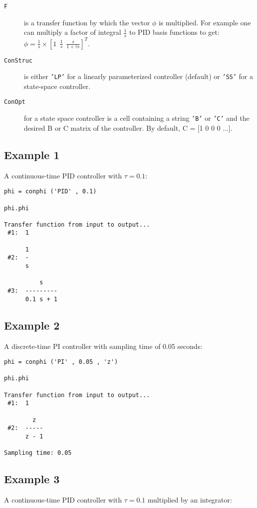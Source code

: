 \documentclass [12pt , a4paper] {report}
\begin{document}
\begin{description}
\item[\texttt{F}] is a transfer function by which the vector $\phi$ is multiplied. For example one can multiply a factor of integral $\frac{1}{s}$ to PID basis functions to get: $\phi=\frac{1}{s} \times [1\:\: \frac{1}{s} \:\: \frac{s}{1+\tau s}]^T$.

\item[\texttt{ConStruc}] is either \texttt{'LP'} for a linearly parameterized controller (default) or \texttt{'SS'} for a state-space controller.

\item[\texttt{ConOpt}] for a state space controller is a cell containing a string \texttt{'B'} or \texttt{'C'} and the desired B or C matrix of the controller. By default, C = [1 0 0 0 ...].
    

\end{description}


\subsection{Example 1} A continuous-time PID controller with $\tau=0.1$:

\begin{lstlisting}
phi = conphi ('PID' , 0.1) 

phi.phi
 
Transfer function from input to output...
 #1:  1
 
      1
 #2:  -
      s
 
          s
 #3:  ---------
      0.1 s + 1      
\end{lstlisting}

\subsection{Example 2} A discrete-time PI controller with sampling time of 0.05 seconds:

\begin{lstlisting}
phi = conphi ('PI' , 0.05 , 'z') 

phi.phi
 
Transfer function from input to output...
 #1:  1
 
        z
 #2:  -----
      z - 1
 
Sampling time: 0.05
\end{lstlisting}

\subsection{Example 3} A continuous-time PID controller with $\tau=0.1$ multiplied by an integrator:
\end{document}
